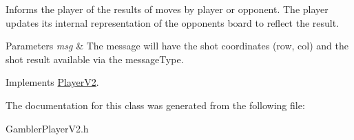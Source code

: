 Informs the player of the results of move\textquotesingle{}s by player or opponent. The player updates its internal representation of the opponent\textquotesingle{}s board to reflect the result. 


\begin{DoxyParams}{Parameters}
{\em msg} & The message will have the shot coordinates (row, col) and the shot result available via the message\+Type. \\
\hline
\end{DoxyParams}


Implements \hyperlink{classPlayerV2_a8d87312a1ce2756e25bb6e6438e8673c}{Player\+V2}.



The documentation for this class was generated from the following file\+:\begin{DoxyCompactItemize}
\item 
Gambler\+Player\+V2.\+h\end{DoxyCompactItemize}
